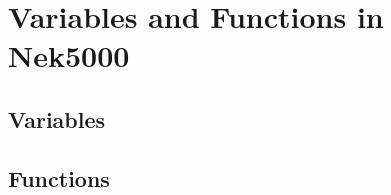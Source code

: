 
\chapter{Variables and Functions in Nek5000} %

\label{AppendixB} %


\section{Variables}

\section{Functions}
